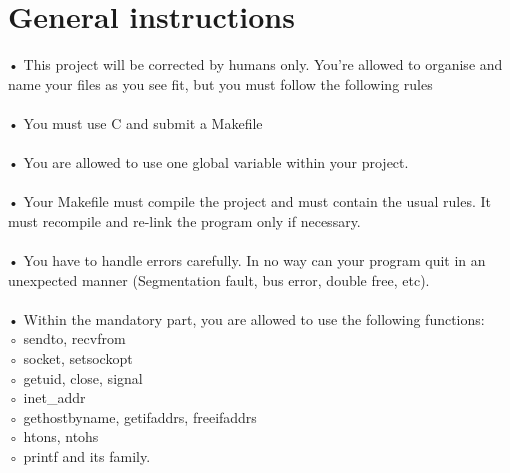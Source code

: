 \documentclass{42-en}
\begin{document}
\chapter{General instructions}

    • This project will be corrected by humans only. You’re allowed to organise and name your files as you see fit, but you must follow the following rules\\
    \\
    • You must use C and submit a Makefile\\
    \\
    • You are allowed to use one global variable within your project.\\
    \\
    • Your Makefile must compile the project and must contain the usual rules. It must recompile and re-link the program only if necessary.\\
    \\
    • You have to handle errors carefully. In no way can your program quit in an unexpected manner (Segmentation fault, bus error, double free, etc).\\
    \\
    • Within the mandatory part, you are allowed to use the following functions:\\

            ◦ sendto, recvfrom\\

            ◦ socket, setsockopt\\  

            ◦ getuid, close, signal\\

            ◦ inet\_addr\\

            ◦ gethostbyname, getifaddrs, freeifaddrs\\ 

            ◦ htons, ntohs\\  

            ◦ printf and its family.\\  
\end{document}
